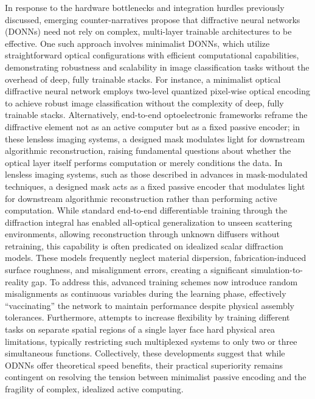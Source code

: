 In response to the hardware bottlenecks and integration hurdles previously discussed, emerging counter-narratives propose that diffractive neural networks (DONNs) need not rely on complex, multi-layer trainable architectures to be effective. One such approach involves minimalist DONNs, which utilize straightforward optical configurations with efficient computational capabilities, demonstrating robustness and scalability in image classification tasks without the overhead of deep, fully trainable stacks. For instance, a minimalist optical diffractive neural network employs two-level quantized pixel-wise optical encoding to achieve robust image classification without the complexity of deep, fully trainable stacks. \citep{doi_10_1002_lpor_202402303_1f555bd4} Alternatively, end-to-end optoelectronic frameworks reframe the diffractive element not as an active computer but as a fixed passive encoder; in these lensless imaging systems, a designed mask modulates light for downstream algorithmic reconstruction, raising fundamental questions about whether the optical layer itself performs computation or merely conditions the data. In lensless imaging systems, such as those described in advances in mask-modulated techniques, a designed mask acts as a fixed passive encoder that modulates light for downstream algorithmic reconstruction rather than performing active computation. \citep{doi_10_3390_electronics13030617_5b341306} While standard end-to-end differentiable training through the diffraction integral has enabled all-optical generalization to unseen scattering environments, allowing reconstruction through unknown diffusers without retraining, this capability is often predicated on idealized scalar diffraction models. These models frequently neglect material dispersion, fabrication-induced surface roughness, and misalignment errors, creating a significant simulation-to-reality gap. To address this, advanced training schemes now introduce random misalignments as continuous variables during the learning phase, effectively ``vaccinating'' the network to maintain performance despite physical assembly tolerances. Furthermore, attempts to increase flexibility by training different tasks on separate spatial regions of a single layer face hard physical area limitations, typically restricting such multiplexed systems to only two or three simultaneous functions. Collectively, these developments suggest that while ODNNs offer theoretical speed benefits, their practical superiority remains contingent on resolving the tension between minimalist passive encoding and the fragility of complex, idealized active computing. \citep{doi_10_1038_s41377_022_00725_8_57c4c704} \citep{doi_10_1002_lpor_202402303_1f555bd4} \citep{doi_10_48550_arxiv_2411_05748_a91b6f61} \citep{doi_10_3390_electronics13030617_5b341306} \citep{doi_10_1515_nanoph_2020_0291_c4a9f42d}

